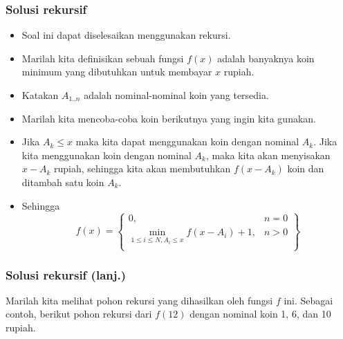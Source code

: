 \begin{frame}
\frametitle{Solusi rekursif}
\begin{itemize}
  \item Soal ini dapat diselesaikan menggunakan rekursi.
  \item Marilah kita definisikan sebuah fungsi $f(x)$ adalah banyaknya koin minimum yang dibutuhkan untuk membayar $x$ rupiah.
  \item Katakan $A_{1..n}$ adalah nominal-nominal koin yang tersedia.
  \item Marilah kita mencoba-coba koin berikutnya yang ingin kita gunakan.
  \item Jika $A_k \leq x$ maka kita dapat menggunakan koin dengan nominal $A_k$. Jika kita menggunakan koin dengan nominal $A_k$, maka kita akan menyisakan $x - A_k$ rupiah, sehingga kita akan membutuhkan $f(x-A_k)$ koin dan ditambah satu koin $A_k$.
   \item Sehingga 
   \[f(x) = \left\{\begin{array}{lr}
        0, & n = 0\\
        \min_{1 \leq i \leq N, A_i \leq x} {f(x - A_i) + 1}, & n > 0\\
        \end{array}\right\}\]
 \end{itemize}
\end{frame}

\begin{frame} [fragile]
\frametitle{Solusi rekursif (lanj.)}
Marilah kita melihat pohon rekursi yang dihasilkan oleh fungsi $f$ ini. Sebagai contoh, berikut pohon rekursi dari $f(12)$ dengan nominal koin 1, 6, dan 10 rupiah.
\scalebox{.5}{
\Tree [.$f(12)$
  [.$f(2)$
    [.$f(1)$
      [.$f(0)$ ]
    ]
  ]
  [.$f(6)$
    [.$f(0)$ ]
    [.$f(5)$
      [.$f(4)$
        [.$f(3)$
          [.$f(2)$
            [.$f(1)$
              [.$f(0)$ ]
            ]
          ]
        ]
      ]
    ]
  ]
  [.$f(11)$
    [.$f(1)$
      [.$f(0)$ ]
    ]
    [.$f(5)$
      [.$f(4)$
        [.$f(3)$
          [.$f(2)$
            [.$f(1)$
              [.$f(0)$ ]
            ]
          ]
        ]
      ]
    ]
    [.$f(10)$ 
      [.$f(0)$ ]
      [.$f(4)$
        [.$f(3)$
          [.$f(2)$
            [.$f(1)$
              [.$f(0)$ ]
            ]
          ]
        ]
      ]
      [.$f(9)$
        [.$f(3)$
          [.$f(2)$
            [.$f(1)$
              [.$f(0)$ ]
            ]
          ]
        ]
        [.$f(8)$
          [.$f(2)$
            [.$f(1)$
              [.$f(0)$ ]
            ]
          ]
          [.$f(7)$
            [.$f(1)$
              [.$f(0)$ ]
            ]
            [.$f(6)$
              [.$f(0)$ ]
              [.$f(5)$ 
                [.$f(4)$ ...
                ]
              ]
            ]
          ]
        ]
      ]
    ]
  ]
]
}
\end{frame}


